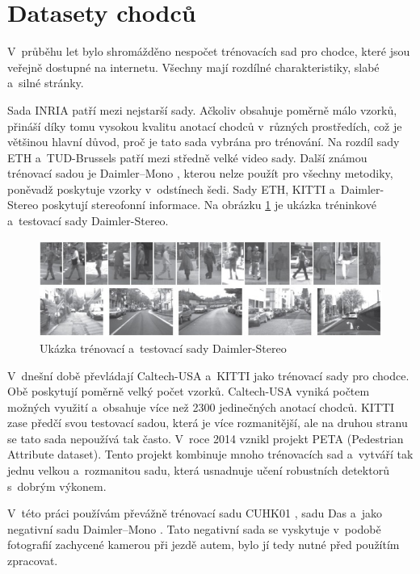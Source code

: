 \section{Datasety chodců} 
V~průběhu let bylo shromážděno nespočet trénovacích sad pro chodce, které jsou veřejně dostupné na internetu. Všechny mají rozdílné charakteristiky, slabé a~silné stránky. 

Sada INRIA \cite{inria} patří mezi nejstarší sady. Ačkoliv obsahuje poměrně málo vzorků, přináší díky tomu vysokou kvalitu anotací chodců v~různých prostředích, což je většinou hlavní důvod, proč je tato sada vybrána pro trénování. Na rozdíl sady ETH \cite{eth} a~TUD-Brussels \cite{tudbrussels} patří mezi středně velké video sady. Další známou trénovací sadou je Daimler--Mono \cite{daimler}, kterou nelze použít pro všechny metodiky, poněvadž poskytuje vzorky v~odstínech šedi. Sady ETH, KITTI \cite{kitti} a~Daimler-Stereo \cite{daimlerstereo} poskytují stereofonní informace. Na obrázku \ref{fig:daimler_stereo} je ukázka tréninkové a~testovací sady Daimler-Stereo. 

\begin{figure}[H]
\centering
\includegraphics[width=16cm]{figures/daimler_stereo}
\caption{Ukázka trénovací a~testovací sady Daimler-Stereo \cite{daimlerstereo}}
\label{fig:daimler_stereo}
\end{figure}

V~dnešní době převládají Caltech-USA \cite{caltech} a~KITTI jako trénovací sady pro chodce. Obě poskytují poměrně velký počet vzorků. Caltech-USA vyniká počtem možných využití a~obsahuje více než 2300 jedinečných anotací chodců. KITTI zase předčí svou testovací sadou, která je více rozmanitější, ale na druhou stranu se tato sada nepoužívá tak často. V~roce 2014 vznikl projekt PETA (Pedestrian Attribute dataset)\cite{peta}. Tento projekt kombinuje mnoho trénovacích sad a~vytváří tak jednu velkou a~rozmanitou sadu, která usnadnuje učení robustních detektorů s~dobrým výkonem.

V~této práci používám převážně trénovací sadu CUHK01 \cite{cuhk}, sadu Das \cite{sudipdas} a~jako negativní sadu Daimler--Mono \cite{daimler}. Tato negativní sada se vyskytuje v~podobě fotografií zachycené kamerou při jezdě autem, bylo jí tedy nutné před použítím zpracovat. 

